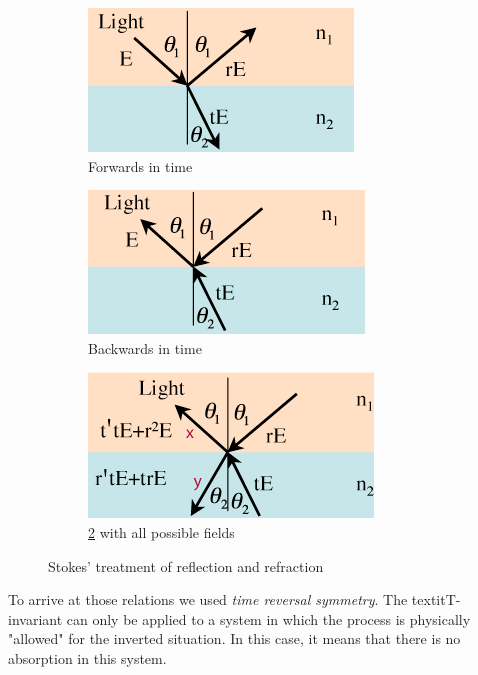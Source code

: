 \begin{figure}[ht]
    \centering
    \begin{subfigure}[b]{0.3\textwidth}
        \centering
        \includegraphics[width = \textwidth]{Bilder/Grundlagen/StokeRelat1.png}
        \caption{Forwards in time}
        \label{fig:Stokfor}
    \end{subfigure}
    \hfill
    \begin{subfigure}[b]{0.3\textwidth}
        \centering
        \includegraphics[width=\textwidth]{Bilder/Grundlagen/StokeRelat2.png}
        \caption{Backwards in time}
        \label{fig:Stockback}
    \end{subfigure}
    \hfill
    \begin{subfigure}[b]{0.3\textwidth}
        \centering
        \includegraphics[width=\textwidth]{Bilder/Grundlagen/StokeRelat3.png}
        \caption{\ref{fig:Stockback} with all possible fields}
        \label{fig:five over x}
    \end{subfigure}
       \caption{Stokes' treatment of reflection and refraction}
       \label{fig:Stokrel}
\end{figure}

To arrive at those relations we used \textit{time reversal symmetry}. The textit{T-invariant} can only be applied to a system in which the process is physically "allowed"
for the inverted situation. In this case, it means that there is no absorption in this system.